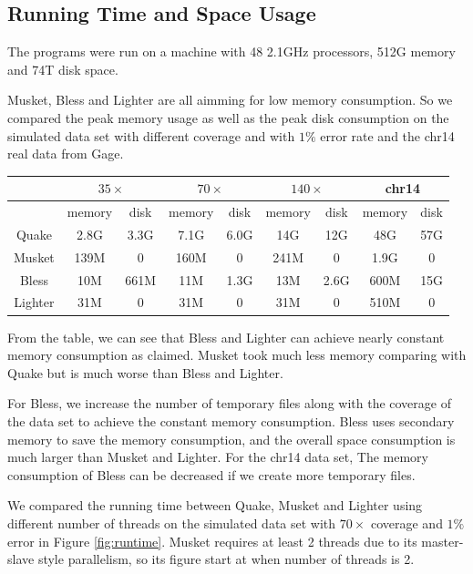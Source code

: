 \documentclass[10pt]{article}
\begin{document}
\subsection*{Running Time and Space Usage}
The programs were run on a machine with 48 2.1GHz processors, 512G memory and 74T disk space. 

Musket, Bless and Lighter are all aimming for low memory consumption. So we compared the peak memory usage as well as the peak disk consumption on the simulated data set with different coverage and with $1\%$ error rate and the chr14 real data from Gage.

\begin{tabular}{|c|c|c||c|c||c|c||c|c|} \hline
		& \multicolumn{2}{|c||}{$35\times$} & \multicolumn{2}{|c||}{$70\times$}  & \multicolumn{2}{|c||}{$140\times$} & \multicolumn{2}{|c|}{chr14}  \\ \hline
		& memory & disk & memory & disk & memory & disk & memory & disk \\ \hline
Quake   & 2.8G	& 3.3G & 7.1G & 6.0G & 14G & 12G & 48G & 57G \\ \hline		
Musket	& 139M	& 0 & 160M & 0 & 241M & 0 & 1.9G & 0 \\ \hline
Bless	& 10M	& 661M & 11M & 1.3G & 13M & 2.6G & 600M & 15G \\ \hline
Lighter	& 31M	& 0 & 31M & 0 & 31M & 0 & 510M & 0 \\ \hline
\end{tabular}

From the table, we can see that Bless and Lighter can achieve nearly constant memory consumption as claimed. Musket took much less memory comparing with Quake but is much worse than Bless and Lighter.

For Bless, we increase the number of temporary files along with the coverage of the data set to achieve the constant memory consumption. Bless uses secondary memory to save the memory consumption, and the overall space consumption is much larger than Musket and Lighter.  For the chr14 data set, The memory consumption of Bless can be decreased if we create more temporary files. 

We compared the running time between Quake, Musket and Lighter using different number of threads on the simulated data set with $70\times$ coverage and $1\%$ error in Figure \ref{fig:runtime}. Musket requires at least 2 threads due to its master-slave style parallelism, so its figure start at when number of threads is 2. 
\end{document}
